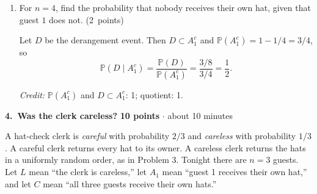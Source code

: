 \documentclass[11pt,letterpaper]{article}
\newcommand{\Prob}{\mathbb P}
\newcommand{\partpts}[1]{\unskip\nobreak\hspace{.3em}%
  \mbox{\small\color{muted}(#1 points)}}
\newcommand{\credit}[1]{\par{\footnotesize\color{muted}\textit{Credit:} #1}}
\newcommand{\problem}[4]{\par\addvspace{8pt}%
  {\large\bfseries\color{indigo}#1.\ #2}\hfill
  {\small\color{muted}\textbf{#3 points} $\cdot$ about #4 minutes}\par\nobreak}
\begin{document}
\begin{enumerate}
  \item For $n=4$, find the probability that nobody receives their own hat,
  given that guest $1$ does not. \partpts{2}
  \begin{solution}[.9in]
    Let $D$ be the derangement event. Then $D\subset A_1^c$ and
    $\Prob(A_1^c)=1-1/4=3/4$, so
    \[
      \Prob(D\mid A_1^c)=\frac{\Prob(D)}{\Prob(A_1^c)}=\frac{3/8}{3/4}=\frac12.
    \]
    \credit{$\Prob(A_1^c)$ and $D\subset A_1^c$: 1; quotient: 1.}
  \end{solution}
\end{enumerate}

\newpage
\problem{4}{Was the clerk careless?}{10}{10}
A hat-check clerk is \emph{careful} with probability $2/3$ and
\emph{careless} with probability $1/3$. A careful clerk returns every hat to
its owner. A careless clerk returns the hats in a uniformly random order, as
in Problem 3. Tonight there are $n=3$ guests. Let $L$ mean ``the clerk is
careless,'' let $A_1$ mean ``guest 1 receives their own hat,'' and let $C$
mean ``all three guests receive their own hats.''
\end{document}
